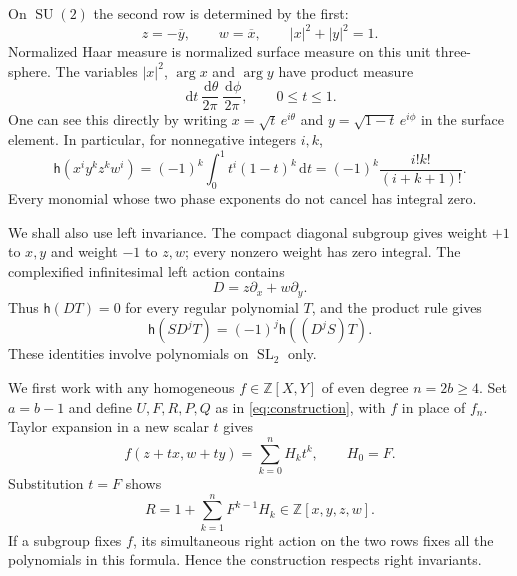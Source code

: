 \documentclass[11pt]{article}
\numberwithin{equation}{section}
\theoremstyle{definition}
\theoremstyle{remark}
\newcommand{\Z}{\mathbb Z}
\newcommand{\dd}{\,\mathrm d}
\newcommand{\h}{\mathsf h}
\newcommand{\SL}{\operatorname{SL}}
\newcommand{\SU}{\operatorname{SU}}
\begin{document}
On $\SU(2)$ the second row is determined by the first:
\begin{equation}\label{eq:su2coords}
 z=-\overline y,\qquad w=\overline x,\qquad |x|^2+|y|^2=1.
\end{equation}
Normalized Haar measure is normalized surface measure on this unit
three-sphere. The variables $|x|^2$, $\arg x$ and $\arg y$ have product
measure
\[
 \dd t\,\frac{\dd\theta}{2\pi}\,\frac{\dd\phi}{2\pi},
 \qquad 0\leq t\leq1.
\]
One can see this directly by writing
$x=\sqrt t\,e^{i\theta}$ and $y=\sqrt{1-t}\,e^{i\phi}$ in the surface
element. In particular, for nonnegative integers $i,k$,
\begin{equation}\label{eq:beta}
 \h(x^iy^kz^kw^i)
 =(-1)^k\int_0^1t^i(1-t)^k\dd t
 =(-1)^k\frac{i!k!}{(i+k+1)!}.
\end{equation}
Every monomial whose two phase exponents do not cancel has integral zero.

We shall also use left invariance. The compact diagonal subgroup gives
weight $+1$ to $x,y$ and weight $-1$ to $z,w$; every nonzero weight has
zero integral. The complexified infinitesimal left action contains
\[
 D=z\partial_x+w\partial_y.
\]
Thus $\h(DT)=0$ for every regular polynomial $T$, and the product rule gives
\begin{equation}\label{eq:ibp}
 \h(SD^jT)=(-1)^j\h((D^jS)T).
\end{equation}
These identities involve polynomials on $\SL_2$ only.

We first work with any homogeneous $f\in\Z[X,Y]$ of even degree $n=2b\geq4$.
Set $a=b-1$ and define $U,F,R,P,Q$ as in
\eqref{eq:construction}, with $f$ in place of $f_n$.
Taylor expansion in a new scalar $t$ gives
\[
 f(z+tx,w+ty)=\sum_{k=0}^n H_k t^k,\qquad H_0=F.
\]
Substitution $t=F$ shows
\begin{equation}\label{eq:Rregular}
 R=1+\sum_{k=1}^n F^{k-1}H_k\in\Z[x,y,z,w].
\end{equation}
If a subgroup fixes $f$, its simultaneous right action on the two rows
fixes all the polynomials in this formula. Hence the construction respects
right invariants.
\end{document}
